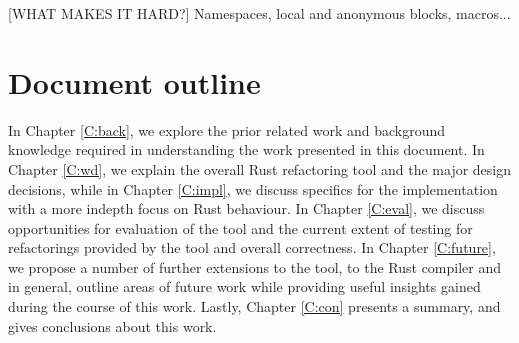 [WHAT MAKES IT HARD?] Namespaces, local and anonymous blocks, macros... 

\section{Document outline}\label{S:outline}
In Chapter \ref{C:back}, we explore the prior related work and background knowledge required in understanding the work presented in this document. In Chapter \ref{C:wd}, we explain the overall Rust refactoring tool and the major design decisions, while in Chapter \ref{C:impl}, we discuss specifics for the implementation with a more indepth focus on Rust behaviour. In Chapter \ref{C:eval}, we discuss opportunities for evaluation of the tool and the current extent of testing for refactorings provided by the tool and overall correctness. In Chapter \ref{C:future}, we propose a number of further extensions to the tool, to the Rust compiler and in general, outline areas of future work while providing useful insights gained during the course of this work. Lastly, Chapter \ref{C:con} presents a summary, and gives conclusions about this work.
